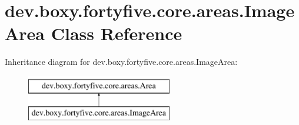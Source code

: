 \hypertarget{classdev_1_1boxy_1_1fortyfive_1_1core_1_1areas_1_1_image_area}{
\section{dev.boxy.fortyfive.core.areas.ImageArea Class Reference}
\label{d1/d98/classdev_1_1boxy_1_1fortyfive_1_1core_1_1areas_1_1_image_area}
}
Inheritance diagram for dev.boxy.fortyfive.core.areas.ImageArea:\begin{figure}[H]
\begin{center}
\leavevmode
\includegraphics[height=2.000000cm]{d1/d98/classdev_1_1boxy_1_1fortyfive_1_1core_1_1areas_1_1_image_area}
\end{center}
\end{figure}
